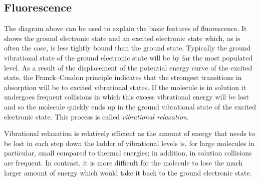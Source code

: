 \documentclass{article}
\theoremstyle{plain}\theoremheaderfont{\normalfont\itshape}\theorembodyfont{\rmfamily}\theoremseparator{.}\newtheorem*{rem}{Remark}\newtheorem*{ex}{Example}\newtheorem*{proof}{Proof}\newtheorem*{altp}{Alternative proof}
\theoremstyle{plain}\theoremheaderfont{\normalfont\bfseries}\theorembodyfont{\rmfamily}\theoremseparator{.}\newtheorem{thm}{Theorem}[section]\newtheorem{lem}[thm]{Lemma}\newtheorem{prop}[thm]{Proposition}\newtheorem*{cor}{Corollary}\newtheorem{defn}[thm]{Definition}\newtheorem{clm}[thm]{Claim}\newtheorem{clminproof}{Claim}\newtheorem{pos}{Postulate}[section]
\theoremstyle{break}\theoremheaderfont{\normalfont\itshape}\theorembodyfont{\rmfamily}\theoremseparator{.\medskip}\newtheorem*{proofskip}{Proof}\newtheorem*{exs}{Examples}\newtheorem*{rems}{Remarks}
\theoremstyle{break}\theoremheaderfont{\normalfont\bfseries}\theorembodyfont{\rmfamily}\theoremseparator{.\medskip}\newtheorem{lemskip}[thm]{Lemma}\newtheorem{defnskip}[thm]{Definition}\newtheorem{propskip}[thm]{Proposition}\newtheorem{thmskip}[thm]{Theorem}
\numberwithin{equation}{section}
\begin{document}
    \subsection{Fluorescence}
    \begin{figure}[ht!]
        \centering
    \end{figure}
    The diagram above can be used to explain the basic features of fluorescence. It shows the ground electronic state and an excited electronic state which, as is often the case, is less tightly bound than the ground state. Typically the ground vibrational state of the ground electronic state will be by far the most populated level. As a result of the displacement of the potential energy curve of the excited state, the Franck--Condon principle indicates that the strongest transitions in absorption will be to excited vibrational states. If the molecule is in solution it undergoes frequent collisions in which this excess vibrational energy will be lost and so the molecule quickly ends up in the ground vibrational state of the excited electronic state. This process is called \textit{vibrational relaxation}.

    Vibrational relaxation is relatively efficient as the amount of energy that needs to be lost in each step down the ladder of vibrational levels is, for large molecules in particular, small compared to thermal energies; in addition, in solution collisions are frequent. In contrast, it is more difficult for the molecule to lose the much larger amount of energy which would take it back to the ground electronic state.
\end{document}
